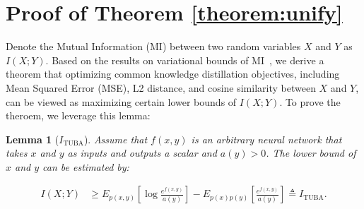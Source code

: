 \documentclass[11pt]{article}
\newtheorem{lemma}{Lemma}
\begin{document}
\section{Proof of Theorem \ref{theorem:unify}}
\setcounter{theorem}{0}
\renewcommand{\theequation}{A.\arabic{theorem}}
\label{sec:appdx:proof}
\noindent Denote the Mutual Information (MI) between two random variables $X$ and $Y$ as $I(X; Y)$. Based on the results on variational bounds of MI~\citep{poole2019variational}, we derive a theorem that optimizing common knowledge distillation objectives, including Mean Squared Error (MSE), L2 distance, and cosine similarity between $X$ and $Y$, can be viewed as maximizing certain lower bounds of $I(X; Y)$. To prove the theroem, we leverage this lemma:

\begin{lemma}
[$I_{\text{TUBA}}$]
Assume that $f(x,y)$ is an arbitrary neural network that takes $x$ and $y$ as inputs and outputs a scalar and $a(y)>0$. The lower bound of $x$ and $y$ can be estimated by:
\begin{small}
\begin{equation*}
\begin{aligned}
    I (X;Y) &\geq E_{p(x,y)}[ \log \frac{e^{f(x,y)}}{a(y)}] - E_{p(x)p(y)}[\frac{e^{f(x,y)}}{a(y)}] \triangleq I_{\text{TUBA}}.
\end{aligned}
\end{equation*}
\end{small}
\label{lemma:tuba}
\end{lemma}

\end{document}
